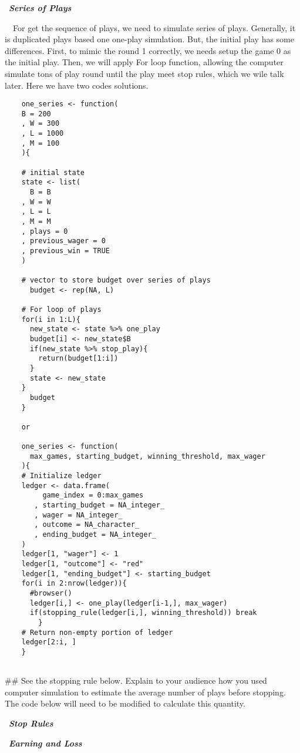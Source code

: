 \documentclass[
]{article}
\begin{document}
 \textbf{\emph{Series of Plays}}

 For get the sequence of plays, we need to simulate series of plays.
Generally, it is duplicated plays based one one-play simulation. But,
the initial play has some differences. First, to mimic the round 1
correctly, we needs setup the game 0 as the initial play. Then, we will
apply For loop function, allowing the computer simulate tons of play
round until the play meet stop rules, which we wile talk later. Here we
have two codes solutions.

\begin{verbatim}
    one_series <- function(
    B = 200
    , W = 300
    , L = 1000
    , M = 100
    ){

    # initial state
    state <- list(
      B = B
    , W = W
    , L = L
    , M = M
    , plays = 0
    , previous_wager = 0
    , previous_win = TRUE
    )

    # vector to store budget over series of plays
      budget <- rep(NA, L)

    # For loop of plays
    for(i in 1:L){
      new_state <- state %>% one_play
      budget[i] <- new_state$B
      if(new_state %>% stop_play){
        return(budget[1:i])
      }
      state <- new_state
    }
      budget    
    }

    or
      
    one_series <- function(
      max_games, starting_budget, winning_threshold, max_wager
    ){
    # Initialize ledger
    ledger <- data.frame(
         game_index = 0:max_games
       , starting_budget = NA_integer_
       , wager = NA_integer_
       , outcome = NA_character_
       , ending_budget = NA_integer_
    )
    ledger[1, "wager"] <- 1
    ledger[1, "outcome"] <- "red"
    ledger[1, "ending_budget"] <- starting_budget
    for(i in 2:nrow(ledger)){
      #browser()
      ledger[i,] <- one_play(ledger[i-1,], max_wager)
      if(stopping_rule(ledger[i,], winning_threshold)) break
        }
    # Return non-empty portion of ledger
    ledger[2:i, ]
    }
    
\end{verbatim}

\#\# See the stopping rule below. Explain to your audience how you used
computer simulation to estimate the average number of plays before
stopping. The code below will need to be modified to calculate this
quantity.

 \textbf{\emph{Stop Rules}}

 \textbf{\emph{Earning and Loss}}
\end{document}
